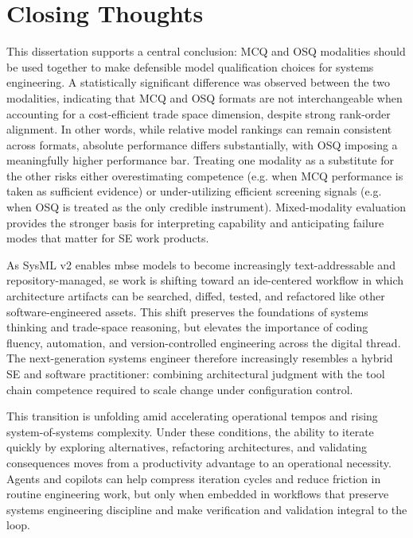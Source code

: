 \section{Closing Thoughts}\label{sec:final_thoughts}

This dissertation supports a central conclusion: MCQ and OSQ modalities should be used together to make defensible model qualification choices for systems engineering. A statistically significant difference was observed between the two modalities, indicating that MCQ and OSQ formats are not interchangeable when accounting for a cost-efficient trade space dimension, despite strong rank-order alignment. In other words, while relative model rankings can remain consistent across formats, absolute performance differs substantially, with OSQ imposing a meaningfully higher performance bar. Treating one modality as a substitute for the other risks either overestimating competence (e.g. when MCQ performance is taken as sufficient evidence) or under-utilizing efficient screening signals (e.g. when OSQ is treated as the only credible instrument). Mixed-modality evaluation provides the stronger basis for interpreting capability and anticipating failure modes that matter for SE work products.

As SysML v2 enables \ac{mbse} models to become increasingly text-addressable and repository-managed, \ac{se} work is shifting toward an \ac{ide}-centered workflow in which architecture artifacts can be searched, diffed, tested, and refactored like other software-engineered assets. This shift preserves the foundations of systems thinking and trade-space reasoning, but elevates the importance of coding fluency, automation, and version-controlled engineering across the digital thread. The next-generation systems engineer therefore increasingly resembles a hybrid SE and software practitioner: combining architectural judgment with the tool chain competence required to scale change under configuration control.

This transition is unfolding amid accelerating operational tempos and rising system-of-systems complexity. Under these conditions, the ability to iterate quickly by exploring alternatives, refactoring architectures, and validating consequences moves from a productivity advantage to an operational necessity. Agents and copilots can help compress iteration cycles and reduce friction in routine engineering work, but only when embedded in workflows that preserve systems engineering discipline and make verification and validation integral to the loop.

